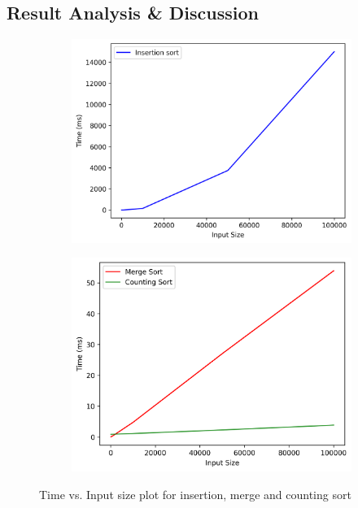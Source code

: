 \subsection{Result Analysis \& Discussion}
\begin{figure}[H]
    \centering
    \begin{subfigure}[b]{0.4\textwidth}
        \centering
        \includegraphics[width=\textwidth]{task1_insertion.png}
    \end{subfigure}
    \hfill
    \begin{subfigure}[b]{0.4\textwidth}
        \centering
        \includegraphics[width=\textwidth]{task1_merge_count.png}
    \end{subfigure}

    \caption{Time vs. Input size plot for insertion, merge and counting sort}
    \label{fig:task1plot}
\end{figure}

